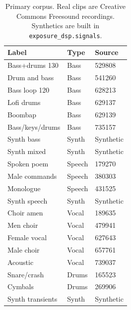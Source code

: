 \begin{table}[!htbp]
\centering
\caption{Primary corpus. Real clips are Creative Commons Freesound recordings. Synthetics are built in \texttt{exposure\_dsp.signals}.}
\label{tab:inventory}
\renewcommand{\arraystretch}{1.08}
\begin{tabular}{l l l}
\hline
Label & Type & Source \\
\hline
Bass+drums 130 & Bass & 529808 \\
Drum and bass & Bass & 541260 \\
Bass loop 120 & Bass & 628213 \\
Lofi drums & Bass & 629137 \\
Boombap & Bass & 629139 \\
Bass/keys/drums & Bass & 735157 \\
Synth bass & Synth & Synthetic \\
Synth mixed & Synth & Synthetic \\
Spoken poem & Speech & 179270 \\
Male commands & Speech & 380303 \\
Monologue & Speech & 431525 \\
Synth speech & Synth & Synthetic \\
Choir amen & Vocal & 189635 \\
Men choir & Vocal & 479941 \\
Female vocal & Vocal & 627643 \\
Male choir & Vocal & 657761 \\
Acoustic & Vocal & 739037 \\
Snare/crash & Drums & 165523 \\
Cymbals & Drums & 269906 \\
Synth transients & Synth & Synthetic \\
\hline
\end{tabular}
\end{table}
